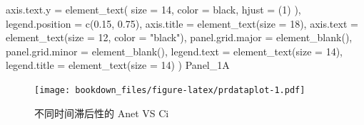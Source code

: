 \documentclass[
]{krantz}
\makeatletter
\newenvironment{Shaded}{\begin{snugshade}}{\end{snugshade}}
\newcommand{\AttributeTok}[1]{\textcolor[rgb]{0.77,0.63,0.00}{#1}}
\newcommand{\DecValTok}[1]{\textcolor[rgb]{0.00,0.00,0.81}{#1}}
\newcommand{\FloatTok}[1]{\textcolor[rgb]{0.00,0.00,0.81}{#1}}
\newcommand{\FunctionTok}[1]{\textcolor[rgb]{0.00,0.00,0.00}{#1}}
\newcommand{\NormalTok}[1]{#1}
\newcommand{\StringTok}[1]{\textcolor[rgb]{0.31,0.60,0.02}{#1}}
\newenvironment{kframe}{%
\medskip{}
\setlength{\fboxsep}{.8em}
 \def\at@end@of@kframe{}%
 \ifinner\ifhmode%
  \def\at@end@of@kframe{\end{minipage}}%
  \begin{minipage}{\columnwidth}%
 \fi\fi%
 \def\FrameCommand##1{\hskip\@totalleftmargin \hskip-\fboxsep
 \colorbox{shadecolor}{##1}\hskip-\fboxsep
     \hskip-\linewidth \hskip-\@totalleftmargin \hskip\columnwidth}%
 \MakeFramed {\advance\hsize-\width
   \@totalleftmargin\z@ \linewidth\hsize
   \@setminipage}}%
 {\par\unskip\endMakeFramed%
 \at@end@of@kframe}
\renewenvironment{Shaded}{\begin{kframe}}{\end{kframe}}
\makeatother
\begin{document}
\begin{Shaded}
\begin{Highlighting}[]
    \AttributeTok{axis.text.y =}
      \FunctionTok{element\_text}\NormalTok{(}
        \AttributeTok{size =} \DecValTok{14}\NormalTok{,}
        \AttributeTok{color =} \StringTok{\textquotesingle{}black\textquotesingle{}}\NormalTok{,}
        \AttributeTok{hjust =}\NormalTok{ (}\DecValTok{1}\NormalTok{)}
\NormalTok{      ),}
    \AttributeTok{legend.position =} \FunctionTok{c}\NormalTok{(}\FloatTok{0.15}\NormalTok{, }\FloatTok{0.75}\NormalTok{),}
    \AttributeTok{axis.title =} \FunctionTok{element\_text}\NormalTok{(}\AttributeTok{size =} \DecValTok{18}\NormalTok{),}
    \AttributeTok{axis.text =} \FunctionTok{element\_text}\NormalTok{(}\AttributeTok{size =} \DecValTok{12}\NormalTok{, }\AttributeTok{color =} \StringTok{"black"}\NormalTok{),}
    \AttributeTok{panel.grid.major =} \FunctionTok{element\_blank}\NormalTok{(),}
    \AttributeTok{panel.grid.minor =} \FunctionTok{element\_blank}\NormalTok{(),}
    \AttributeTok{legend.text =} \FunctionTok{element\_text}\NormalTok{(}\AttributeTok{size =} \DecValTok{14}\NormalTok{),}
    \AttributeTok{legend.title =} \FunctionTok{element\_text}\NormalTok{(}\AttributeTok{size =} \DecValTok{14}\NormalTok{)}
\NormalTok{  )}
\NormalTok{Panel\_1A}
\end{Highlighting}
\end{Shaded}

\begin{figure}
\centering
\texttt{[image: bookdown\_files/figure-latex/prdataplot-1.pdf]}
\caption{\label{fig:prdataplot}不同时间滞后性的 Anet VS Ci}
\end{figure}
\end{document}
